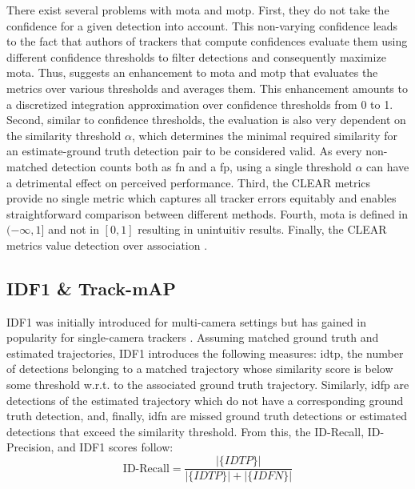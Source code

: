 \documentclass[headsepline, hidelinks, footsepline, footinclude=false, oneside, fontsize=11pt, paper=a4, listof=totoc, bibliography=totoc]{scrbook}
\begin{document}
There exist several problems with \gls{mota} and \gls{motp}.
First, they do not take the confidence for a given detection into account. 
This non-varying confidence leads to the fact that authors of trackers that compute confidences evaluate them using different confidence thresholds to filter detections and consequently maximize \gls{mota}. Thus, \cite{wengBaseline3DMultiObject2019} suggests an enhancement to \gls{mota} and \gls{motp} that evaluates the metrics over various thresholds and averages them. This enhancement amounts to a discretized
integration approximation over confidence thresholds from 0 to 1.
Second, similar to confidence thresholds, the evaluation is also very dependent on the similarity threshold \(\alpha\), which determines the minimal required similarity for an estimate-ground truth detection pair to be considered valid.
As every non-matched detection counts both as \gls{fn} and a \gls{fp}, using a single threshold \(\alpha\) can have a detrimental effect on perceived performance. 
Third, the CLEAR metrics provide no single metric which captures all tracker errors equitably and enables straightforward comparison between different methods.
Fourth, \gls{mota} is defined in \((-\infty, 1]\) and not in \([0, 1]\) resulting in unintuitiv results.
Finally, the CLEAR metrics value detection over association \cite{luitenHOTAHigherOrder2021}.

\subsection{IDF1 \& Track-mAP}
\label{sec:org1221aec}
    IDF1 \cite{ristaniPerformanceMeasuresData2016} was initially introduced for multi-camera settings but has gained in popularity for single-camera trackers \cite{luitenHOTAHigherOrder2021}.
Assuming matched ground truth and estimated trajectories, IDF1 introduces the following measures: \gls{idtp}, the number of detections belonging to a matched trajectory whose similarity score
is below some threshold w.r.t. to the associated ground truth trajectory. Similarly, \gls{idfp} are detections of the estimated trajectory which do not have a corresponding ground truth detection, and, finally,
\gls{idfn} are missed ground truth detections or estimated detections that exceed the similarity threshold. From this, the ID-Recall, ID-Precision, and IDF1 scores follow:
\begin{equation}
\text{ID-Recall} = \frac{|\{IDTP\}|}{|\{IDTP\}| + |\{IDFN\}|}
\end{equation}
\end{document}
